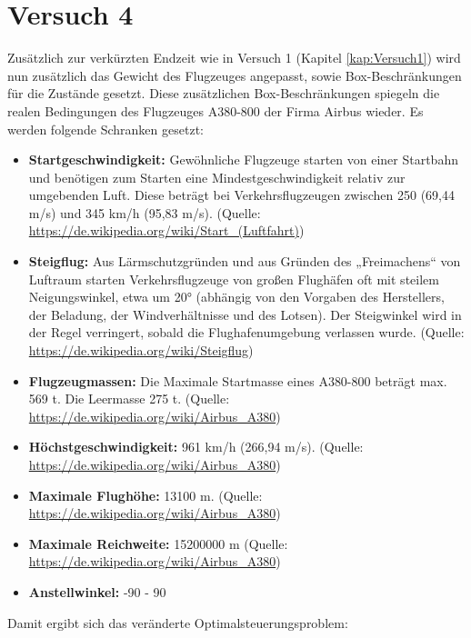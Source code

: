 \newpage
\section{Versuch 4}
Zusätzlich zur verkürzten Endzeit wie in Versuch 1 (Kapitel \ref{kap:Versuch1}) wird nun zusätzlich das Gewicht des Flugzeuges angepasst, sowie Box-Beschränkungen für die Zustände gesetzt. Diese zusätzlichen Box-Beschränkungen spiegeln die realen Bedingungen des Flugzeuges A380-800 der Firma Airbus wieder. Es werden folgende Schranken gesetzt:
\begin{itemize}
\item \textbf{Startgeschwindigkeit:} Gewöhnliche Flugzeuge starten von einer Startbahn und benötigen zum Starten eine Mindestgeschwindigkeit relativ zur umgebenden Luft. Diese beträgt bei Verkehrsflugzeugen zwischen 250 (69,44 m/s) und 345 km/h (95,83 m/s). (Quelle: \url{https://de.wikipedia.org/wiki/Start_(Luftfahrt)})
%
\item \textbf{Steigflug:} Aus Lärmschutzgründen und aus Gründen des „Freimachens“ von Luftraum starten Verkehrsflugzeuge von großen Flughäfen oft mit steilem Neigungswinkel, etwa um 20° (abhängig von den Vorgaben des Herstellers, der Beladung, der Windverhältnisse und des Lotsen). Der Steigwinkel wird in der Regel verringert, sobald die Flughafenumgebung verlassen wurde. (Quelle: \url{https://de.wikipedia.org/wiki/Steigflug})
%
\item \textbf{Flugzeugmassen:} Die Maximale Startmasse eines A380-800 beträgt max. 569 t. Die Leermasse 275 t. (Quelle: \url{https://de.wikipedia.org/wiki/Airbus_A380})
%
\item \textbf{Höchstgeschwindigkeit:} 961 km/h (266,94 m/s). (Quelle: \url{https://de.wikipedia.org/wiki/Airbus_A380})
%
\item \textbf{Maximale Flughöhe:} 13100 m. (Quelle: \url{https://de.wikipedia.org/wiki/Airbus_A380})
%
\item \textbf{Maximale Reichweite:} 15200000 m (Quelle: \url{https://de.wikipedia.org/wiki/Airbus_A380})
%
\item \textbf{Anstellwinkel:} -90 - 90
\end{itemize}
Damit ergibt sich das veränderte Optimalsteuerungsproblem:
